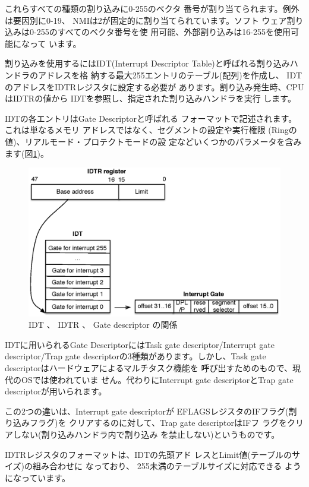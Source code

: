  これらすべての種類の割り込みに0-255のベクタ
番号が割り当てられます。例外は要因別に0-19、
NMIは2が固定的に割り当てられています。ソフト
ウェア割り込みは0-255のすべてのベクタ番号を使
用可能、外部割り込みは16-255を使用可能になって
います。

 割り込みを使用するにはIDT(Interrupt Descriptor
Table)と呼ばれる割り込みハンドラのアドレスを格
納する最大255エントリのテーブル(配列)を作成し、
IDTのアドレスをIDTRレジスタに設定する必要が
あります。割り込み発生時、CPUはIDTRの値から
IDTを参照し、指定された割り込みハンドラを実行
します。

 IDTの各エントリはGate Descriptorと呼ばれる
フォーマットで記述されます。これは単なるメモリ
アドレスではなく、セグメントの設定や実行権限
(Ringの値)、リアルモード・プロテクトモードの設
定などいくつかのパラメータを含みます(図\ref{fig1})。

\begin{figure}\centering
\includegraphics{figures/part4_fig1.eps}
\caption{IDT 、 IDTR 、 Gate descriptor の関係}
\label{fig1}
\end{figure}

 IDTに用いられるGate DescriptorにはTask gate
descriptor/Interrupt gate descriptor/Trap gate
descriptorの3種類があります。しかし、Task gate
descriptorはハードウェアによるマルチタスク機能を
呼び出すためのもので、現代のOSでは使われていま
せん。代わりにInterrupt gate descriptorとTrap gate
descriptorが用いられます。

 この2つの違いは、Interrupt gate descriptorが
EFLAGSレジスタのIFフラグ(割り込みフラグ)を
クリアするのに対して、Trap gate descriptorはIFフ
ラグをクリアしない(割り込みハンドラ内で割り込み
を禁止しない)というものです。

 IDTRレジスタのフォーマットは、IDTの先頭アド
レスとLimit値(テーブルのサイズ)の組み合わせに
なっており、 255未満のテーブルサイズに対応できる
ようになっています。


